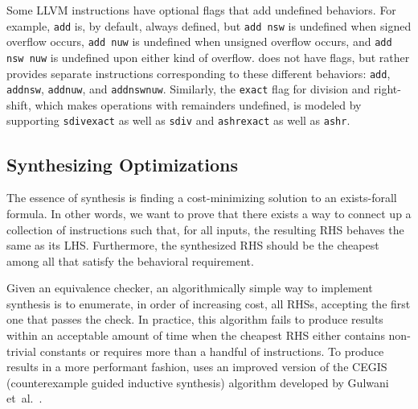 Some LLVM instructions have optional flags that add undefined behaviors.
%
For example, \texttt{add} is, by default, always defined, but
\texttt{add nsw} is undefined when signed overflow occurs, \texttt{add
  nuw} is undefined when unsigned overflow occurs, and \texttt{add nsw
  nuw} is undefined upon either kind of overflow.
%
\tool{} does not have flags, but rather provides separate instructions
corresponding to these different behaviors: \texttt{add},
\texttt{addnsw}, \texttt{addnuw}, and \texttt{addnswnuw}.
%
Similarly, the \texttt{exact} flag for division and right-shift, which
makes operations with remainders undefined, is modeled by supporting
\texttt{sdivexact} as well as \texttt{sdiv} and \texttt{ashrexact} as
well as \texttt{ashr}.


\subsection{Synthesizing Optimizations}

The essence of synthesis is finding a cost-minimizing solution to an
exists-forall formula.
%
In other words, we want to prove that there exists a way to connect up
a collection of instructions such that, for all inputs, the resulting
RHS behaves the same as its LHS\@.
%
Furthermore, the synthesized RHS should be the cheapest among all
that satisfy the behavioral requirement.


Given an equivalence checker, an algorithmically simple way to
implement synthesis is to enumerate, in order of increasing cost, all
RHSs, accepting the first one that passes the check.
%
In practice, this algorithm fails to produce results within an
acceptable amount of time when the cheapest RHS either contains
non-trivial constants or requires more than a handful of instructions.
%
To produce results in a more performant fashion, \tool{} uses
an improved version of the CEGIS (counterexample guided inductive
synthesis) algorithm developed by Gulwani et~al.~\cite{Gulwani11}.


